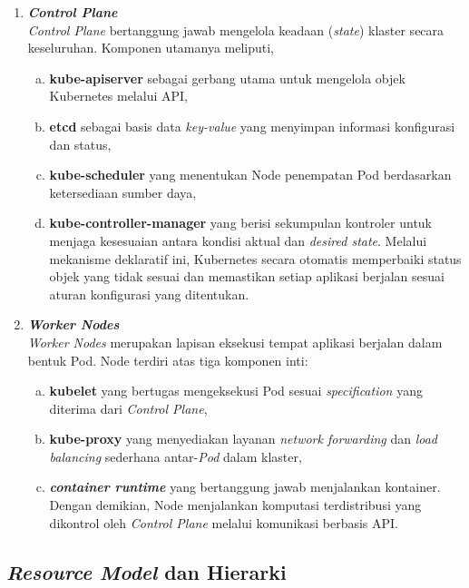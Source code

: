 \begin{enumerate}
    \item \textbf{\textit{Control Plane}}\\
    \textit{Control Plane} bertanggung jawab mengelola keadaan (\textit{state}) klaster secara keseluruhan. Komponen utamanya meliputi,
    \begin{enumerate}[a.]
        \item \textbf{kube-apiserver} sebagai gerbang utama untuk mengelola objek Kubernetes melalui API,
        \item \textbf{etcd} sebagai basis data \textit{key-value} yang menyimpan informasi konfigurasi dan status,
        \item \textbf{kube-scheduler} yang menentukan Node penempatan Pod berdasarkan ketersediaan sumber daya,
        \item \textbf{kube-controller-manager} yang berisi sekumpulan kontroler untuk menjaga kesesuaian antara kondisi aktual dan \textit{desired state}. Melalui mekanisme deklaratif ini, Kubernetes secara otomatis memperbaiki status objek yang tidak sesuai dan memastikan setiap aplikasi berjalan sesuai aturan konfigurasi yang ditentukan.
    \end{enumerate}
    \item \textbf{\textit{Worker Nodes}}\\
    \textit{Worker Nodes} merupakan lapisan eksekusi tempat aplikasi berjalan dalam bentuk Pod. Node terdiri atas tiga komponen inti:
    \begin{enumerate}[a.]
        \item \textbf{kubelet} yang bertugas mengeksekusi Pod sesuai \textit{specification} yang diterima dari \textit{Control Plane},
        \item \textbf{kube-proxy} yang menyediakan layanan \textit{network forwarding} dan \textit{load balancing} sederhana antar-\textit{Pod} dalam klaster,
        \item \textbf{\textit{container runtime}} yang bertanggung jawab menjalankan kontainer. Dengan demikian, Node menjalankan komputasi terdistribusi yang dikontrol oleh \textit{Control Plane} melalui komunikasi berbasis API.
    \end{enumerate}
\end{enumerate}

\subsection{\textit{Resource Model} dan Hierarki}

